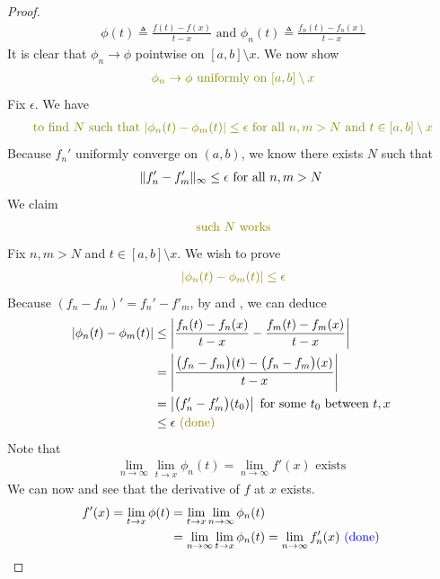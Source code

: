 \documentclass{report}
\begin{document}
\begin{proof}
\begin{align*}
\phi (t)\triangleq \frac{f(t)-f(x)}{t-x}\text{ and }\phi_n(t)\triangleq \frac{f_n(t)-f_n(x)}{t-x}
\end{align*}
It is clear that $\phi_n\to \phi$ pointwise on $[a,b]\setminus x$. We now show 
\begin{align*}
\olive{\phi_n\to \phi\text{ uniformly on }[a,b]\setminus x}
\end{align*}
Fix $\epsilon $. We have
\begin{align*}
  \olive{\text{ to find $N$ such that  $\abso{\phi_n(t)-\phi _m(t)}\leq \epsilon $ for all $n,m>N$ and  $t\in [a,b]\setminus x$ }}
\end{align*}
Because $f_n'$ uniformly converge on  $(a,b)$, we know there exists $N$ such that 
 \begin{align}
\label{CUaC1}
\| f_n'-f_m' \|_\infty\leq \epsilon \text{ for all $n,m>N$ }
\end{align}
We claim 
\begin{align*}
\olive{\text{ such }N\text{ works }}
\end{align*}
Fix $n,m>N$ and $t \in [a,b]\setminus x$. We wish to prove 
\begin{align*}
\olive{\abso{\phi_n(t)-\phi_m(t)}\leq \epsilon }
\end{align*}
Because $(f_n-f_m)'=f_n'-f'_m$, by  and , we can deduce 
\begin{align*}
  \abso{\phi_n(t)-\phi_m(t)}&\leq \abso{\frac{f_n(t)-f_n(x)}{t-x}-\frac{f_m(t)-f_m(x)}{t-x}}\\
                            &=\abso{\frac{\big(f_n-f_m\big)(t)-\big(f_n-f_m\big)(x)}{t-x}}\\
 &=\abso{\big(f'_n-f'_m\big)(t_0)}\text{ for some $t_0$ between $t,x$  }\\
&\leq \epsilon \odone
\end{align*}
Note that 
\begin{align*}
\lim_{n\to \infty}\lim_{t\to x}\phi_n(t)=\lim_{n\to \infty}f'(x)\text{ exists }
\end{align*}
We can now  and see that the derivative of $f$ at $x$ exists. 
\begin{align*}
f'(x)=\lim_{t\to x}\phi (t)&=\lim_{t\to x}\lim_{n\to \infty}\phi_n(t)\\
&=\lim_{n\to \infty}\lim_{t\to x}\phi_n(t)=\lim_{n\to \infty}f'_n(x) \textcolor{blue}{\text{ (done) }}
\end{align*}
\end{proof}
\end{document}
